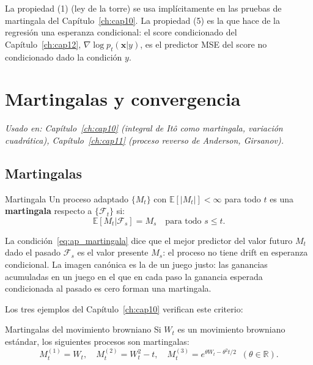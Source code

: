 La propiedad (1) (ley de la torre) se usa implícitamente en las pruebas de
martingala del Capítulo~\ref{ch:cap10}. La propiedad (5) es la que hace de la
regresión una esperanza condicional: el score condicionado del
Capítulo~\ref{ch:cap12}, $\nabla\log p_t(\bm{x}|y)$, es el predictor MSE del
score no condicionado dado la condición $y$.

\section{Martingalas y convergencia}
\label{sec:ap_martingalas}

\textit{Usado en: Capítulo~\ref{ch:cap10} (integral de Itô como martingala,
variación cuadrática), Capítulo~\ref{ch:cap11} (proceso reverso de Anderson,
Girsanov).}

\subsection{Martingalas}
\label{subsec:ap_martingala_def}

\begin{definicion}{Martingala}
\label{def:ap_martingala}
Un proceso adaptado $\{M_t\}$ con $\mathbb{E}[|M_t|]<\infty$ para todo $t$
es una \textbf{martingala} respecto a $\{\mathcal{F}_t\}$ si:
\begin{equation}
  \mathbb{E}[M_t|\mathcal{F}_s] = M_s \quad\text{para todo }s\leq t.
  \label{eq:ap_martingala}
\end{equation}
\end{definicion}

La condición~\eqref{eq:ap_martingala} dice que el mejor predictor del valor
futuro $M_t$ dado el pasado $\mathcal{F}_s$ es el valor presente $M_s$: el
proceso no tiene drift en esperanza condicional. La imagen canónica es la de
un juego justo: las ganancias acumuladas en un juego en el que en cada paso
la ganancia esperada condicionada al pasado es cero forman una martingala.

Los tres ejemplos del Capítulo~\ref{ch:cap10} verifican este criterio:

\begin{proposicion}{Martingalas del movimiento browniano}
\label{prop:ap_mart_browniano}
Si $W_t$ es un movimiento browniano estándar, los siguientes procesos son
martingalas:
\[
  M_t^{(1)} = W_t, \quad
  M_t^{(2)} = W_t^2 - t, \quad
  M_t^{(3)} = e^{\theta W_t - \theta^2 t/2} \;\;(\theta\in\mathbb{R}).
\]
\end{proposicion}

